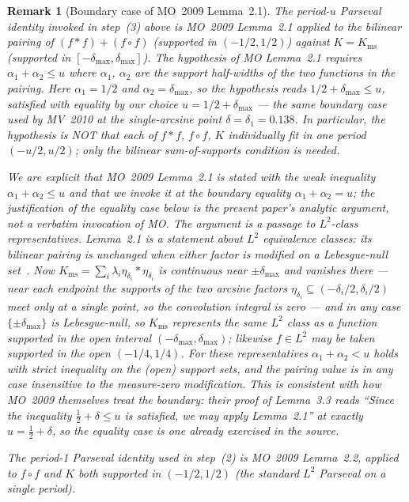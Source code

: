 \documentclass[11pt, letterpaper]{article}
\theoremstyle{paperplain}
\theoremstyle{paperdef}
\newtheorem{remark}[theorem]{Remark}
\begin{document}
\begin{remark}[Boundary case of MO~2009 Lemma~2.1]\label{rem:mo-boundary}
The period-$u$ Parseval identity invoked in step~(3) above is
MO~2009 Lemma~2.1 applied to the \emph{bilinear} pairing of
$(f*f)+(f\circ f)$ (supported in $(-1/2,1/2)$) against $K=K_{\mathrm{ms}}$
(supported in $[-\delta_{\max},\delta_{\max}]$).  The hypothesis of MO
Lemma~2.1 requires $\alpha_1+\alpha_2\le u$ where $\alpha_1$, $\alpha_2$
are the support half-widths of the two functions in the pairing.  Here
$\alpha_1=1/2$ and $\alpha_2=\delta_{\max}$, so the hypothesis reads
$1/2+\delta_{\max}\le u$, satisfied with equality by our choice
$u=1/2+\delta_{\max}$ --- the same boundary case used by MV~2010 at the
single-arcsine point $\delta=\delta_1=0.138$.  In particular, the
hypothesis is NOT that each of $f*f$, $f\circ f$, $K$ individually fit
in one period $(-u/2,u/2)$; only the bilinear sum-of-supports condition
is needed.

We are explicit that MO~2009 Lemma~2.1 is \emph{stated} with the weak
inequality $\alpha_1+\alpha_2\le u$ and that we invoke it at the
boundary equality $\alpha_1+\alpha_2=u$; the justification of the
equality case below is the present paper's analytic argument, not a
verbatim invocation of MO.  The argument is a passage to $L^2$-class
representatives.  Lemma~2.1 is a statement about $L^2$ equivalence
classes: its bilinear pairing is unchanged when either factor is
modified on a Lebesgue-null set~\cite[\S 2.1]{Folland}.  Now
$K_{\mathrm{ms}}=\sum_i\lambda_i\eta_{\delta_i}*\eta_{\delta_i}$ is
continuous near $\pm\delta_{\max}$ and vanishes there --- near each
endpoint the supports of the two arcsine factors
$\eta_{\delta_i}\subseteq(-\delta_i/2,\delta_i/2)$ meet only at a
single point, so the convolution integral is zero --- and in any case
$\{\pm\delta_{\max}\}$ is Lebesgue-null, so $K_{\mathrm{ms}}$
represents the same $L^2$ class as a function supported in the
\emph{open} interval $(-\delta_{\max},\delta_{\max})$;
likewise $f\in L^2$ may be taken supported in the open
$(-1/4,1/4)$.  For these representatives
$\alpha_1+\alpha_2<u$ holds with strict inequality on the (open)
support sets, and the pairing value is in any case insensitive to the
measure-zero modification.  This is consistent with how MO~2009
themselves treat the boundary: their proof of Lemma~3.3 reads
``\emph{Since the inequality $\tfrac12+\delta\le u$ is satisfied, we
may apply Lemma~2.1}'' at exactly $u=\tfrac12+\delta$, so the equality
case is one already exercised in the source.

The period-1 Parseval identity used in step~(2) is MO~2009
Lemma~2.2, applied to $f\circ f$ and $K$ both supported in
$(-1/2,1/2)$ (the standard $L^2$ Parseval on a single period).
\end{remark}
\end{document}
